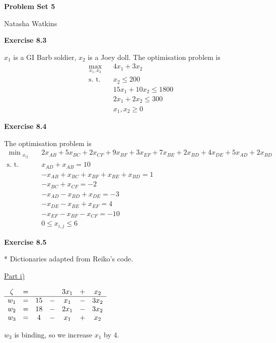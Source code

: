 \documentclass[letterpaper,12pt]{article}
\begin{document}
\textbf{\large Problem Set 5}

Natasha Watkins

\vspace{5mm}

\textbf{Exercise 8.3}

$x_1$ is a GI Barb soldier, $x_2$ is a Joey doll. The optimisation problem is
\begin{align*}
\max_{x_1, x_2} \ & 4x_1 + 3x_2 \\
\text{s. t.} \quad & x_2 \leq 200 \\
& 15x_1 + 10 x_2 \leq 1800 \\
& 2x_1 + 2x_2 \leq 300 \\
& x_1, x_2 \geq 0
\end{align*}

\textbf{Exercise 8.4}

The optimisation problem is
\begin{align*}
\min{_{x_{ij}}} \quad & 2 x_{AB} + 5 x_{BC} + 2 x_{CF} + 9 x_{BF} + 3 x_{EF} + 7 x_{BE} + 2 x_{BD} + 4 x_{DE} + 5 x_{AD} + 2 x_{BD} \\
\text{s. t.} \quad & x_{AD} + x_{AB} = 10 \\
& -x_{AB} + x_{BC} + x_{BF} + x_{BE} + x_{BD} = 1 \\
& -x_{BC} + x_{CF} = -2 \\
& -x_{AD} - x_{BD} + x_{DE} = -3 \\
& -x_{DE} - x_{BE} + x_{EF} = 4 \\
& -x_{EF} - x_{BF} - x_{CF} = -10 \\
& 0 \leq x_{i, j} \leq 6
\end{align*}

\textbf{Exercise 8.5}

* Dictionaries adapted from Reiko's code.

\underline{Part i)}

\begin{center}
	$\begin{array}{ c c c c c c c c  }
		\zeta & = & & & 3x_1 & + & x_2 \\
		\hline
		w_1 & = & 15 & - & x_1 & - & 3x_2 \\
		w_2 & = & 18 & - & 2x_1 & - & 3x_2 \\
		w_3 & = & 4 & - & x_1 & + & x_2 \\
	\end{array}$ \\
\end{center}

$w_3$ is binding, so we increase $x_1$ by 4. \\
\end{document}
